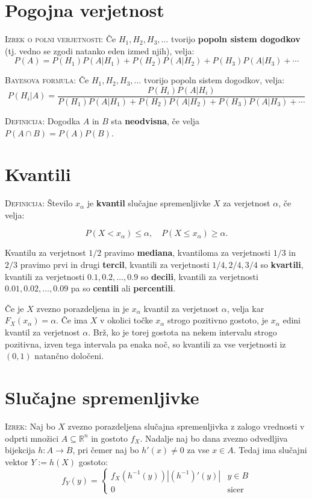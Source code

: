\documentclass[8pt,a4paper]{amsart}
\theoremstyle{definition} %
\theoremstyle{plain} %
\newcommand{\R}{\mathbb R}
\begin{document}
\thispagestyle{empty}
\setlength{\parindent}{0pt}

\section*{Pogojna verjetnost}

\textsc{Izrek o polni verjetnosti:} Če $H_1, H_2, H_3,\ldots$ tvorijo \textbf{popoln sistem dogodkov} (tj. vedno se zgodi natanko eden izmed njih), velja:
$$
P(A) = P(H_1)P(A|H_1)+P(H_2)P(A|H_2)+P(H_3)P(A|H_3)+\cdots
$$

\textsc{Bayesova formula:}  Če $H_1, H_2, H_3,\ldots$ tvorijo popoln sistem dogodkov, velja:
$$
P(H_i|A)=\frac{P(H_i)P(A|H_i)}{P(H_1)P(A|H_1)+P(H_2)P(A|H_2)+P(H_3)P(A|H_3)+\cdots}
$$

\textsc{Definicija:} Dogodka $A$ in $B$ sta \textbf{neodvisna}, če velja $P(A\cap B)=P(A)P(B)$.

\section*{Kvantili} %

\textsc{Definicija: }Število $x_\alpha$ je \textbf{kvantil} slučajne spremenljivke $X$ za verjetnost $\alpha$, če velja:

$$
P(X < x_\alpha) \leq \alpha, \quad P(X \leq x_\alpha) \geq \alpha.
$$

Kvantilu za verjetnost $1/2$ pravimo \textbf{mediana}, kvantiloma za verjetnosti $1/3$ in $2/3$ pravimo prvi in drugi \textbf{tercil}, kvantili za verjetnosti $1/4, 2/4, 3/4$ so \textbf{kvartili}, kvantili za verjetnosti $0.1, 0.2,\ldots, 0.9$ so \textbf{decili}, kvantili za verjetnosti $0.01, 0.02,\ldots, 0.09$ pa so \textbf{centili} ali \textbf{percentili}.

Če je $X$ zvezno porazdeljena in je $x_\alpha$ kvantil za verjetnost $\alpha$, velja kar $F_X(x_\alpha)=\alpha$. Če ima $X$ v okolici točke $x_\alpha$ strogo pozitivno gostoto, je $x_\alpha$ edini kvantil za verjetnost $\alpha$. Brž, ko je torej gostota na nekem intervalu strogo pozitivna, izven tega intervala pa enaka noč, so kvantili za vse verjetnosti iz $(0,1)$ natančno določeni.

\section*{Slučajne spremenljivke}

\textsc{Izrek:} Naj bo $X$ zvezno porazdeljena slučajna spremenljivka z zalogo vrednosti v odprti množici $A \subseteq \R^n$ in gostoto $f_X$. Nadalje naj bo dana zvezno odvedljiva bijekcija $h: A \longrightarrow B$, pri čemer naj bo $h'(x) \neq 0$ za vse $x \in A$. Tedaj ima slučajni vektor $Y := h(X)$ gostoto:
$$
f_Y(y) = \begin{cases} f_X(h^{-1}(y))|(h^{-1})'(y)| & y\in B \\ 
0 & \mbox{sicer} \end{cases}
$$
\end{document}
